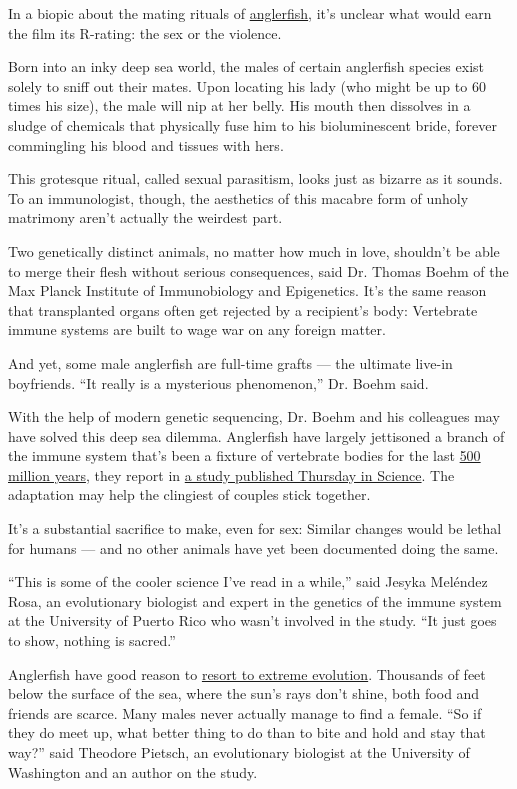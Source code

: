In a biopic about the mating rituals of
\href{https://www.nytimes.com/2019/07/29/science/anglerfish-bioluminescence-deep-sea.html}{anglerfish},
it's unclear what would earn the film its R-rating: the sex or the
violence.

Born into an inky deep sea world, the males of certain anglerfish
species exist solely to sniff out their mates. Upon locating his lady
(who might be up to 60 times his size), the male will nip at her belly.
His mouth then dissolves in a sludge of chemicals that physically fuse
him to his bioluminescent bride, forever commingling his blood and
tissues with hers.

This grotesque ritual, called sexual parasitism, looks just as bizarre
as it sounds. To an immunologist, though, the aesthetics of this macabre
form of unholy matrimony aren't actually the weirdest part.

Two genetically distinct animals, no matter how much in love, shouldn't
be able to merge their flesh without serious consequences, said Dr.
Thomas Boehm of the Max Planck Institute of Immunobiology and
Epigenetics. It's the same reason that transplanted organs often get
rejected by a recipient's body: Vertebrate immune systems are built to
wage war on any foreign matter.

And yet, some male anglerfish are full-time grafts --- the ultimate
live-in boyfriends. ``It really is a mysterious phenomenon,'' Dr. Boehm
said.

With the help of modern genetic sequencing, Dr. Boehm and his colleagues
may have solved this deep sea dilemma. Anglerfish have largely
jettisoned a branch of the immune system that's been a fixture of
vertebrate bodies for the last
\href{https://www.ncbi.nlm.nih.gov/pmc/articles/PMC3805090/}{500 million
years}, they report in
\href{https://science.sciencemag.org/lookup/doi/10.1126/science.aaz9445}{a
study published Thursday in Science}. The adaptation may help the
clingiest of couples stick together.

It's a substantial sacrifice to make, even for sex: Similar changes
would be lethal for humans --- and no other animals have yet been
documented doing the same.

``This is some of the cooler science I've read in a while,'' said Jesyka
Meléndez Rosa, an evolutionary biologist and expert in the genetics of
the immune system at the University of Puerto Rico who wasn't involved
in the study. ``It just goes to show, nothing is sacred.''

Anglerfish have good reason to
\href{https://www.nytimes.com/2020/07/16/science/ultra-black-fish.html}{resort
to extreme evolution}. Thousands of feet below the surface of the sea,
where the sun's rays don't shine, both food and friends are scarce. Many
males never actually manage to find a female. ``So if they do meet up,
what better thing to do than to bite and hold and stay that way?'' said
Theodore Pietsch, an evolutionary biologist at the University of
Washington and an author on the study.

